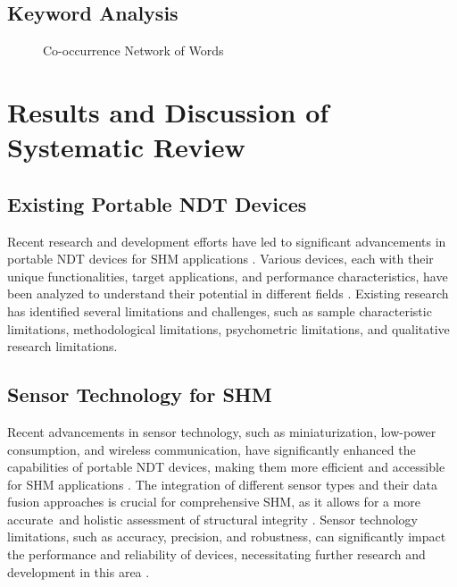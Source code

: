 \documentclass[journal, a4paper]{IEEEtran}
\begin{document}
\subsection{Keyword Analysis}
\lipsum[1]

\begin{figure}[htbp]
  \centering
  \caption{Co-occurrence Network of Words}
  \label{fig:co_occurrence}
\end{figure}

\lipsum[1]


\section{Results and Discussion of Systematic Review}

\subsection{Existing Portable NDT Devices}
Recent research and development efforts have led to significant advancements in portable NDT devices
for SHM applications \cite{Vijayan2023} \cite{Parsy2018} \cite{Hassani2023}.
Various devices, each with their unique functionalities, target applications, and performance characteristics,
have been analyzed to understand their potential in different fields \cite{Khanna2020} \cite{Baig2021} \cite{Corzo2020}.
Existing research has identified several limitations and challenges, such as sample characteristic limitations,
methodological limitations, psychometric limitations, and qualitative research limitations.


\subsection{Sensor Technology for SHM}
Recent advancements in sensor technology, such as miniaturization, low-power consumption, and wireless communication,
have significantly enhanced the capabilities of portable NDT devices,
making them more efficient and accessible for SHM applications \cite{Hassani2023} \cite{Valeske2020}.
The integration of different sensor types and their data fusion approaches is crucial
for comprehensive SHM, as it allows for a more accurate\
and holistic assessment of structural integrity \cite{Broer2022} \cite{Azimi2020}.
Sensor technology limitations, such as accuracy, precision, and robustness,
can significantly impact the performance and reliability of devices,
necessitating further research and development in this area \cite{Varshney2021} \cite{Moore2020}.
\end{document}
